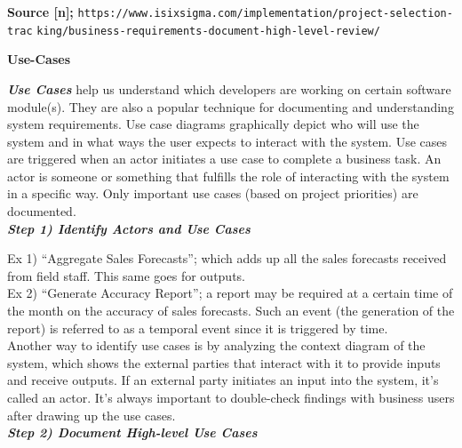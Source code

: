 \documentclass{article}
\begin{document}
{\vspace{0.2cm}

\hspace{-0.65cm} \textbf{Source [n];} \hspace{0.35cm} \texttt{https://www.isixsigma.com/implementation/project-selection-trac}
\texttt{king/business-requirements-document-high-level-review/} 

}

\newpage

\large{\hspace{-0.65cm} \textbf{Use-Cases}} \\

\normalsize{

\textbf{\textit{Use Cases}} help us understand which developers are working on certain software module(s). They are also a popular technique for documenting and understanding system requirements. Use case diagrams graphically depict who will use the system and in what ways the user expects to interact with the system. Use cases are triggered when an actor initiates a use case to complete a business task. An actor is someone or something that fulfills the role of interacting with the system in a specific way. Only important use cases (based on project priorities) are documented. \\

\textbf{\textit{Step 1) Identify Actors and Use Cases}}

\vspace{0.3cm}

\hspace{-0.65cm} Ex 1) “Aggregate Sales Forecasts”; which adds up all the sales forecasts received from field staff. This same goes for outputs. \\
Ex 2) “Generate Accuracy Report”; a report may be required at a certain time of the month on the accuracy of sales forecasts. Such an event (the generation of the report) is referred to as a temporal event since it is triggered by time. \\

Another way to identify use cases is by analyzing the context diagram of the system, which shows the external parties that interact with it to provide inputs and receive outputs. If an external party initiates an input into the system, it’s called an actor. It’s always important to double-check findings with business users after drawing up the use cases. \\

\textbf{\textit{Step 2) Document High-level Use Cases}}

}
\end{document}
